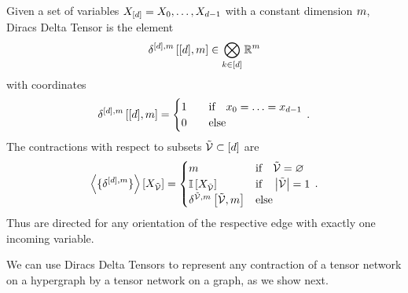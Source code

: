 \begin{example}
    Given a set of variables $X_{[d]}=X_{0},\ldots,X_{d-1}$ with a constant dimension $m$, Diracs Delta Tensor is the element
    \begin{align*}
        \delta^{[d],m}\left[[d],m\right] \in \bigotimes_{k\in[d]} \mathbb{R}^{m}
    \end{align*}
    with coordinates
    \begin{align}
        \delta^{[d],m}\left[[d],m\right] =
        \begin{cases}
            1 \quad & \text{if} \quad x_{0} = \ldots = x_{d-1} \\
            0 & \text{else}
        \end{cases} \, .
    \end{align}
    The contractions with respect to subsets $\tilde{\mathcal{V}}\subset[d]$ are
    \begin{align}
        \left\langle \{\delta^{[d],m}\}\right\rangle \left[ X_{\tilde{\mathcal{V}}} \right] =
        \begin{cases}
            m & \text{if} \quad \tilde{\mathcal{V}} = \varnothing \\
            \mathbb{I}\left[X_{\tilde{\mathcal{V}}}\right] & \text{if} \quad \left|\tilde{\mathcal{V}}\right| = 1\\
            \delta^{\tilde{\mathcal{V}},m}\left[\tilde{\mathcal{V}},m\right] & \text{else}
        \end{cases} \, .
    \end{align}
    Thus are directed for any orientation of the respective edge with exactly one incoming variable.
\end{example}

We can use Diracs Delta Tensors to represent any contraction of a tensor network on a hypergraph by a tensor network on a graph, as we show next.

